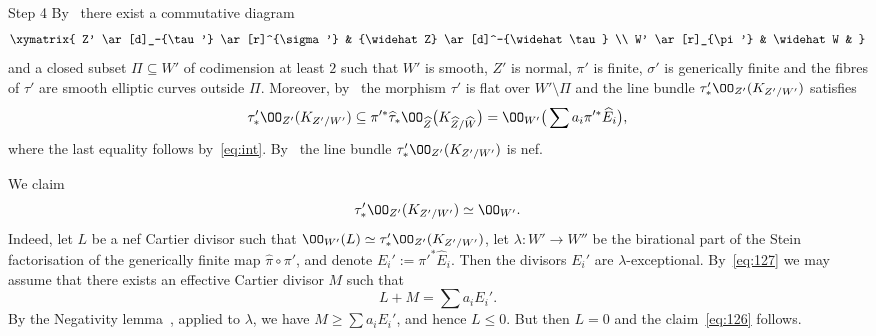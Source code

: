 \begin{proofc}
\begin{step}{Step 4}
By~\cite[Lemma~6.8]{Vi95} there exist a commutative diagram
\[
\xymatrix{ Z' \ar[d]_-{\tau'} \ar[r]^{\sigma'} & {\widehat Z} \ar[d]^-{\widehat \tau} \\
W' \ar[r]_{\pi'} & \widehat W & }
\]
and a closed subset $\Pi\subseteq W'$ of codimension at least $2$ such that $W'$ is smooth, $Z'$ is normal, $\pi'$ is finite, $\sigma' $ is generically finite and the fibres of $\tau'$ are smooth elliptic curves outside $\Pi$. Moreover, by~\cite[Lemma~6.9]{Vi95} the morphism $\tau'$ is flat over $W' \setminus \Pi$ and the line bundle $\tau'_*\OO_{Z'}(K_{Z'/W'})$ satisfies
\begin{equation}\label{eq:127}
\tau'_*\OO_{Z'}(K_{Z'/W'}) \subseteq \pi'^*\widehat\tau_*\OO_{\widehat Z}\big(K_{\widehat Z/ \widehat W}\big) = \OO_{W'}\big(\sum a_i \pi'^*\widehat E_i\big),
\end{equation}
where the last equality follows by~\eqref{eq:int}. By~\cite[Theorem~6.12]{Vi95} the line bundle $\tau'_*\OO_{Z'}(K_{Z' / W'})$ is nef.

We claim
\begin{equation}\label{eq:126}
\tau'_*\OO_{Z'}(K_{Z' / W'})\simeq\OO_{W'}.
\end{equation}
Indeed, let $L$ be a nef Cartier divisor such that $\OO_{W'}(L)\simeq\tau'_*\OO_{Z'}(K_{Z' / W'})$, let $\lambda\colon W'\to W''$ be the birational part of the Stein factorisation of the generically finite map $\widehat \pi \circ \pi'$, and denote $E_i':=\pi'^*\widehat E_i$. Then the divisors $E_i'$ are $\lambda$-exceptional. By~\eqref{eq:127} we may assume that there exists an effective Cartier divisor $M$ such that
\[
L+M=\sum a_i E_i'.
\]
By the Negativity lemma~\cite[Lemma~3.39]{KM98}, applied to $\lambda$, we have $M\geq \sum a_i E_i'$, and hence $L\leq0$. But then $L=0$ and the claim~\eqref{eq:126} follows.
\end{step}


\end{proofc}
